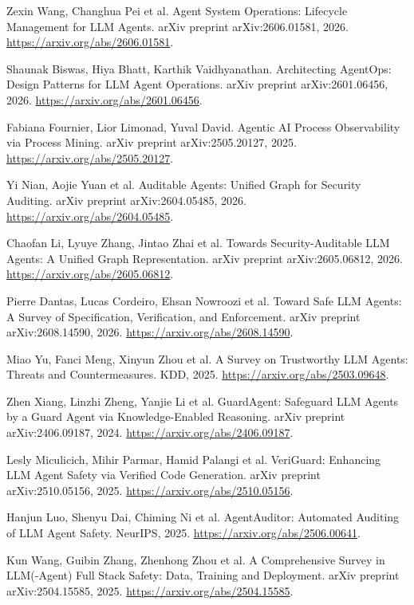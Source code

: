  Zexin Wang, Changhua Pei et al. Agent System Operations: Lifecycle Management for {LLM} Agents. arXiv preprint arXiv:2606.01581, 2026. \url{https://arxiv.org/abs/2606.01581}.

 Shaunak Biswas, Hiya Bhatt, Karthik Vaidhyanathan. Architecting {AgentOps}: Design Patterns for {LLM} Agent Operations. arXiv preprint arXiv:2601.06456, 2026. \url{https://arxiv.org/abs/2601.06456}.

 Fabiana Fournier, Lior Limonad, Yuval David. Agentic {AI} Process Observability via Process Mining. arXiv preprint arXiv:2505.20127, 2025. \url{https://arxiv.org/abs/2505.20127}.

 Yi Nian, Aojie Yuan et al. Auditable Agents: Unified Graph for Security Auditing. arXiv preprint arXiv:2604.05485, 2026. \url{https://arxiv.org/abs/2604.05485}.

 Chaofan Li, Lyuye Zhang, Jintao Zhai et al. Towards Security-Auditable {LLM} Agents: A Unified Graph Representation. arXiv preprint arXiv:2605.06812, 2026. \url{https://arxiv.org/abs/2605.06812}.

 Pierre Dantas, Lucas Cordeiro, Ehsan Nowroozi et al. Toward Safe {LLM} Agents: A Survey of Specification, Verification, and Enforcement. arXiv preprint arXiv:2608.14590, 2026. \url{https://arxiv.org/abs/2608.14590}.

 Miao Yu, Fanci Meng, Xinyun Zhou et al. A Survey on Trustworthy {LLM} Agents: Threats and Countermeasures. KDD, 2025. \url{https://arxiv.org/abs/2503.09648}.

 Zhen Xiang, Linzhi Zheng, Yanjie Li et al. {GuardAgent}: Safeguard {LLM} Agents by a Guard Agent via Knowledge-Enabled Reasoning. arXiv preprint arXiv:2406.09187, 2024. \url{https://arxiv.org/abs/2406.09187}.

 Lesly Miculicich, Mihir Parmar, Hamid Palangi et al. {VeriGuard}: Enhancing {LLM} Agent Safety via Verified Code Generation. arXiv preprint arXiv:2510.05156, 2025. \url{https://arxiv.org/abs/2510.05156}.

 Hanjun Luo, Shenyu Dai, Chiming Ni et al. {AgentAuditor}: Automated Auditing of {LLM} Agent Safety. NeurIPS, 2025. \url{https://arxiv.org/abs/2506.00641}.

 Kun Wang, Guibin Zhang, Zhenhong Zhou et al. A Comprehensive Survey in {LLM}(-Agent) Full Stack Safety: Data, Training and Deployment. arXiv preprint arXiv:2504.15585, 2025. \url{https://arxiv.org/abs/2504.15585}.

